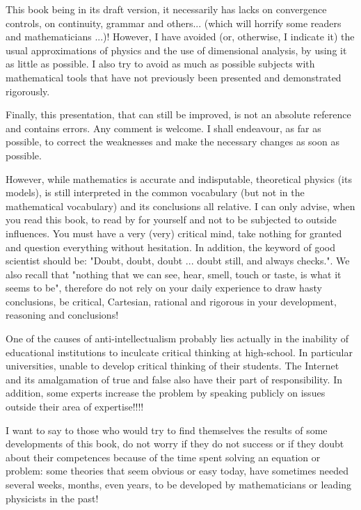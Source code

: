 	This book being in its draft version, it necessarily has lacks on convergence controls, on continuity, grammar and others... (which will horrify some readers and mathematicians ...)! However, I have avoided (or, otherwise, I indicate it) the usual approximations of physics and the use of dimensional analysis, by using it as little as possible. I also try to avoid as much as possible subjects with mathematical tools that have not previously been presented and demonstrated rigorously.
	
	Finally, this presentation, that can still be improved, is not an absolute reference and contains errors. Any comment is welcome. I shall endeavour, as far as possible, to correct the weaknesses and make the necessary changes as soon as possible.
	
	However, while mathematics is accurate and indisputable, theoretical physics (its models), is still interpreted in the common vocabulary (but not in the mathematical vocabulary) and its conclusions all relative. I can only advise, when you read this book, to read by for yourself and not to be subjected to outside influences. You must have a very (very) critical mind, take nothing for granted and question everything without hesitation. In addition, the keyword of good scientist should be: "Doubt, doubt, doubt ... doubt still, and always checks.". We also recall that "nothing that we can see, hear, smell, touch or taste, is what it seems to be", therefore do not rely on your daily experience to draw hasty conclusions, be critical, Cartesian, rational and rigorous in your development, reasoning and conclusions!
	\begin{tcolorbox}[title=Remark,colframe=black,arc=10pt]
	One of the causes of anti-intellectualism probably lies actually in the inability of educational institutions to inculcate critical thinking at high-school. In particular universities, unable to develop critical thinking of their students. The Internet and its amalgamation of true and false also have their part of responsibility. In addition, some experts increase the problem by speaking publicly on issues outside their area of expertise!!!!
	\end{tcolorbox}
	I want to say to those who would try to find themselves the results of some developments of this book, do not worry if they do not success or if they doubt about their competences because of the time spent solving an equation or problem: some theories that seem obvious or easy today, have sometimes needed several weeks, months, even years, to be developed by mathematicians or leading physicists in the past!
	

